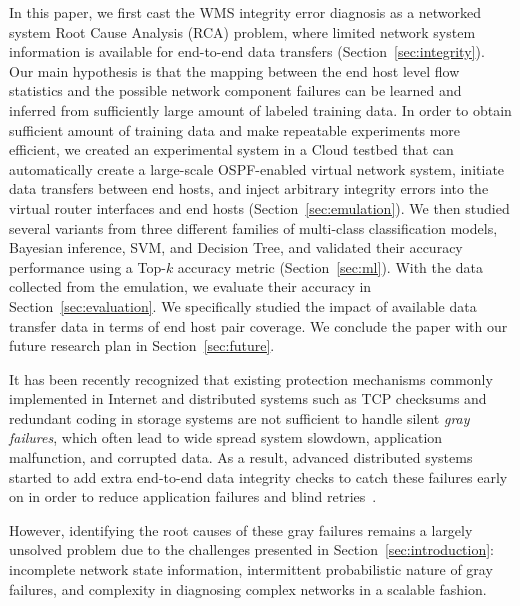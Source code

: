 In this paper, we first cast the WMS integrity error diagnosis as a networked system Root Cause Analysis (RCA) problem, where limited network system information is available for end-to-end data transfers (Section~\ref{sec:integrity}). Our main hypothesis is that the mapping between the end host level flow statistics and the possible network component failures can be learned and inferred from sufficiently large amount of labeled training data. In order to obtain sufficient amount of training data and make repeatable experiments more efficient, we created an experimental system in a Cloud testbed that can automatically create a large-scale OSPF-enabled virtual network system, initiate data transfers between end hosts, and inject arbitrary integrity errors into the virtual router interfaces and end hosts (Section~\ref{sec:emulation}). We then studied several variants from three different families of multi-class classification models, Bayesian inference, SVM, and Decision Tree, and validated their accuracy performance using a Top-$k$ accuracy metric (Section~\ref{sec:ml}). With the data collected from the emulation, we evaluate their accuracy in Section~\ref{sec:evaluation}. We specifically studied the impact of available data transfer data in terms of end host pair coverage. We conclude the paper with our future research plan in Section~\ref{sec:future}.


It has been recently recognized that existing protection mechanisms commonly implemented in Internet and distributed systems such as TCP checksums and redundant coding in storage systems are not sufficient to handle silent {\it gray failures}, which often lead to wide spread system slowdown, application malfunction, and corrupted data. As a result, advanced distributed systems started to add extra end-to-end data integrity checks to catch these failures early on in order to reduce application failures and blind retries~\cite{swip:pearc:2019}. 

However, identifying the root causes of these gray failures remains a largely unsolved problem due to the challenges presented in Section~\ref{sec:introduction}: 
incomplete network state information, intermittent probabilistic nature of gray failures, and complexity in diagnosing complex networks in a scalable fashion.  

